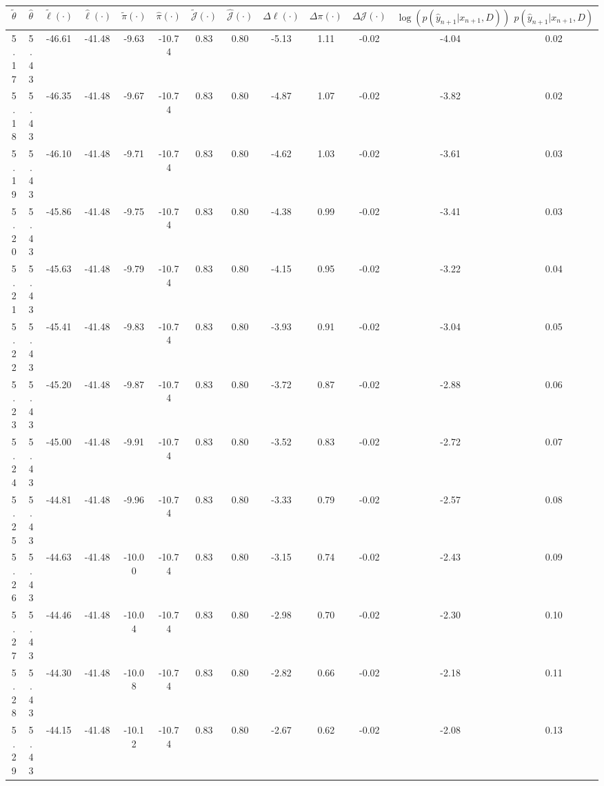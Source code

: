 \begin{table}[htbp]
        \centering
        \tiny
        \begin{adjustbox}{angle=90}
            \begin{tabular}{|c|c|c|c|c|c|c|c|c|c|c|c|c|}
                \hline
                 $\tilde{\theta}$ & $\hat{\theta}$ & $\tilde{\ell}(\cdot)$ & $\hat{\ell}(\cdot)$ & $\tilde{\pi}(\cdot)$ & $\hat{\pi}(\cdot)$ & $\tilde{\mathcal{J}}(\cdot)$ & $\hat{\mathcal{J}}(\cdot)$ & $\Delta \ell(\cdot)$ & $\Delta \pi(\cdot)$ & $\Delta \mathcal{J}(\cdot)$ & $\log(p(\hat{y}_{n+1}|x_{n+1}, D))$ & $p(\hat{y}_{n+1}|x_{n+1}, D)$ \\
                \hline
                 5.17 & 5.43 & -46.61 & -41.48 & -9.63 & -10.74 & 0.83 & 0.80 & -5.13 & 1.11 & -0.02 & -4.04 & 0.02\\ \hline
 5.18 & 5.43 & -46.35 & -41.48 & -9.67 & -10.74 & 0.83 & 0.80 & -4.87 & 1.07 & -0.02 & -3.82 & 0.02\\ \hline
 5.19 & 5.43 & -46.10 & -41.48 & -9.71 & -10.74 & 0.83 & 0.80 & -4.62 & 1.03 & -0.02 & -3.61 & 0.03\\ \hline
 5.20 & 5.43 & -45.86 & -41.48 & -9.75 & -10.74 & 0.83 & 0.80 & -4.38 & 0.99 & -0.02 & -3.41 & 0.03\\ \hline
 5.21 & 5.43 & -45.63 & -41.48 & -9.79 & -10.74 & 0.83 & 0.80 & -4.15 & 0.95 & -0.02 & -3.22 & 0.04\\ \hline
 5.22 & 5.43 & -45.41 & -41.48 & -9.83 & -10.74 & 0.83 & 0.80 & -3.93 & 0.91 & -0.02 & -3.04 & 0.05\\ \hline
 5.23 & 5.43 & -45.20 & -41.48 & -9.87 & -10.74 & 0.83 & 0.80 & -3.72 & 0.87 & -0.02 & -2.88 & 0.06\\ \hline
 5.24 & 5.43 & -45.00 & -41.48 & -9.91 & -10.74 & 0.83 & 0.80 & -3.52 & 0.83 & -0.02 & -2.72 & 0.07\\ \hline
 5.25 & 5.43 & -44.81 & -41.48 & -9.96 & -10.74 & 0.83 & 0.80 & -3.33 & 0.79 & -0.02 & -2.57 & 0.08\\ \hline
 5.26 & 5.43 & -44.63 & -41.48 & -10.00 & -10.74 & 0.83 & 0.80 & -3.15 & 0.74 & -0.02 & -2.43 & 0.09\\ \hline
 5.27 & 5.43 & -44.46 & -41.48 & -10.04 & -10.74 & 0.83 & 0.80 & -2.98 & 0.70 & -0.02 & -2.30 & 0.10\\ \hline
 5.28 & 5.43 & -44.30 & -41.48 & -10.08 & -10.74 & 0.83 & 0.80 & -2.82 & 0.66 & -0.02 & -2.18 & 0.11\\ \hline
 5.29 & 5.43 & -44.15 & -41.48 & -10.12 & -10.74 & 0.83 & 0.80 & -2.67 & 0.62 & -0.02 & -2.08 & 0.13\\ \hline

\end{tabular}
\end{adjustbox}
\end{table}
